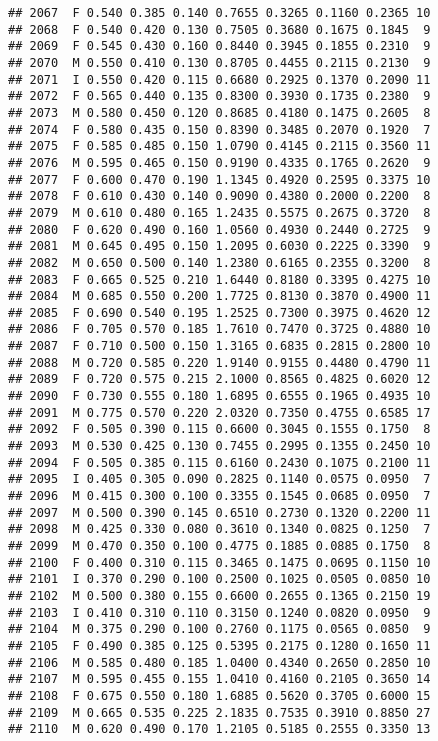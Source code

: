 \documentclass[
]{article}
\begin{document}
\begin{verbatim}
## 2067  F 0.540 0.385 0.140 0.7655 0.3265 0.1160 0.2365 10
## 2068  F 0.540 0.420 0.130 0.7505 0.3680 0.1675 0.1845  9
## 2069  F 0.545 0.430 0.160 0.8440 0.3945 0.1855 0.2310  9
## 2070  M 0.550 0.410 0.130 0.8705 0.4455 0.2115 0.2130  9
## 2071  I 0.550 0.420 0.115 0.6680 0.2925 0.1370 0.2090 11
## 2072  F 0.565 0.440 0.135 0.8300 0.3930 0.1735 0.2380  9
## 2073  M 0.580 0.450 0.120 0.8685 0.4180 0.1475 0.2605  8
## 2074  F 0.580 0.435 0.150 0.8390 0.3485 0.2070 0.1920  7
## 2075  F 0.585 0.485 0.150 1.0790 0.4145 0.2115 0.3560 11
## 2076  M 0.595 0.465 0.150 0.9190 0.4335 0.1765 0.2620  9
## 2077  F 0.600 0.470 0.190 1.1345 0.4920 0.2595 0.3375 10
## 2078  F 0.610 0.430 0.140 0.9090 0.4380 0.2000 0.2200  8
## 2079  M 0.610 0.480 0.165 1.2435 0.5575 0.2675 0.3720  8
## 2080  F 0.620 0.490 0.160 1.0560 0.4930 0.2440 0.2725  9
## 2081  M 0.645 0.495 0.150 1.2095 0.6030 0.2225 0.3390  9
## 2082  M 0.650 0.500 0.140 1.2380 0.6165 0.2355 0.3200  8
## 2083  F 0.665 0.525 0.210 1.6440 0.8180 0.3395 0.4275 10
## 2084  M 0.685 0.550 0.200 1.7725 0.8130 0.3870 0.4900 11
## 2085  F 0.690 0.540 0.195 1.2525 0.7300 0.3975 0.4620 12
## 2086  F 0.705 0.570 0.185 1.7610 0.7470 0.3725 0.4880 10
## 2087  F 0.710 0.500 0.150 1.3165 0.6835 0.2815 0.2800 10
## 2088  M 0.720 0.585 0.220 1.9140 0.9155 0.4480 0.4790 11
## 2089  F 0.720 0.575 0.215 2.1000 0.8565 0.4825 0.6020 12
## 2090  F 0.730 0.555 0.180 1.6895 0.6555 0.1965 0.4935 10
## 2091  M 0.775 0.570 0.220 2.0320 0.7350 0.4755 0.6585 17
## 2092  F 0.505 0.390 0.115 0.6600 0.3045 0.1555 0.1750  8
## 2093  M 0.530 0.425 0.130 0.7455 0.2995 0.1355 0.2450 10
## 2094  F 0.505 0.385 0.115 0.6160 0.2430 0.1075 0.2100 11
## 2095  I 0.405 0.305 0.090 0.2825 0.1140 0.0575 0.0950  7
## 2096  M 0.415 0.300 0.100 0.3355 0.1545 0.0685 0.0950  7
## 2097  M 0.500 0.390 0.145 0.6510 0.2730 0.1320 0.2200 11
## 2098  M 0.425 0.330 0.080 0.3610 0.1340 0.0825 0.1250  7
## 2099  M 0.470 0.350 0.100 0.4775 0.1885 0.0885 0.1750  8
## 2100  F 0.400 0.310 0.115 0.3465 0.1475 0.0695 0.1150 10
## 2101  I 0.370 0.290 0.100 0.2500 0.1025 0.0505 0.0850 10
## 2102  M 0.500 0.380 0.155 0.6600 0.2655 0.1365 0.2150 19
## 2103  I 0.410 0.310 0.110 0.3150 0.1240 0.0820 0.0950  9
## 2104  M 0.375 0.290 0.100 0.2760 0.1175 0.0565 0.0850  9
## 2105  F 0.490 0.385 0.125 0.5395 0.2175 0.1280 0.1650 11
## 2106  M 0.585 0.480 0.185 1.0400 0.4340 0.2650 0.2850 10
## 2107  M 0.595 0.455 0.155 1.0410 0.4160 0.2105 0.3650 14
## 2108  F 0.675 0.550 0.180 1.6885 0.5620 0.3705 0.6000 15
## 2109  M 0.665 0.535 0.225 2.1835 0.7535 0.3910 0.8850 27
## 2110  M 0.620 0.490 0.170 1.2105 0.5185 0.2555 0.3350 13

\end{verbatim}
\end{document}

